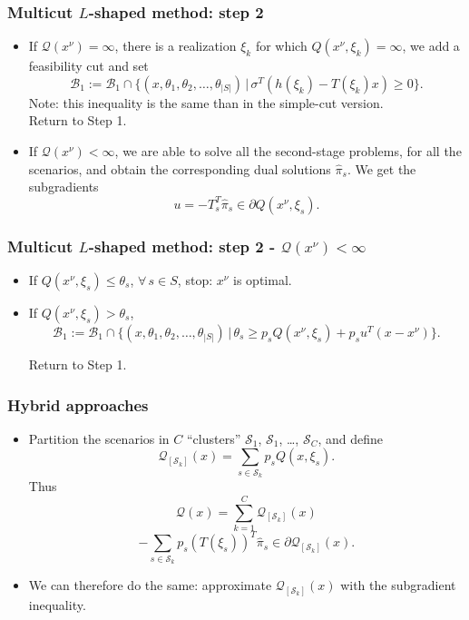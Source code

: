 \documentclass{beamer}
\begin{document}
\begin{frame}
\frametitle{Multicut $L$-shaped method: step 2}
	
\begin{itemize}
\item
If $\mathcal{Q}(x^{\nu}) = \infty$, there is a realization $\xi_k$ for which $Q(x^{\nu}, \xi_k) = \infty$, we add a feasibility cut and set
\[
\mathcal{B}_1 := \mathcal{B}_1 \cap \lbrace
(x,\theta_1,\theta_2,\ldots,\theta_{|S|}) \,|\, \sigma^T(h(\xi_k) -
T(\xi_k)x) \geq 0\rbrace.
\]
Note: this inequality is the same than in the simple-cut version.\\
Return to Step 1.
\item
If $\mathcal{Q}(x^{\nu}) < \infty$, we are able to solve all the second-stage problems, for all the scenarios, and obtain the corresponding dual solutions $\hat{\pi}_s$.
We get the subgradients
\[
u = -T_s^T\hat{\pi}_s \in \partial Q(x^{\nu}, \xi_s).
\]
\end{itemize}
	
\end{frame}

\begin{frame}
\frametitle{Multicut $L$-shaped method: step 2 - $\mathcal{Q}(x^{\nu}) < \infty$}
	
\begin{itemize}
\item
If $Q(x^{\nu}, \xi_s) \leq \theta_s$, $\forall\, s \in S$, stop: $x^{\nu}$ is optimal.
\item
If $Q(x^{\nu}, \xi_s) > \theta_s$,
\[
\mathcal{B}_1 := \mathcal{B}_1 \cap \lbrace (x,\theta_1,\theta_2,\ldots,\theta_{|S|}) \,|\,
\theta_s \geq p_s Q(x^{\nu}, \xi_s) + p_s u^T(x-x^{\nu})\rbrace.
\]
		
Return to Step 1.
\end{itemize}
	
\end{frame}

\begin{frame}
\frametitle{Hybrid approaches}

\begin{itemize}
	\item
	Partition the scenarios in $C$ ``clusters'' $\mathcal{S}_1$,
	$\mathcal{S}_1$, \ldots, $\mathcal{S}_C$, and define
	\[
	\mathcal{Q}_{[\mathcal{S}_k]}(x) = \sum_{s \in \mathcal{S}_k} p_s Q(x, \xi_s).
	\]
	Thus
	\[
	\mathcal{Q}(x) = \sum_{k = 1}^C \mathcal{Q}_{[\mathcal{S}_k]}(x)
	\]
	\[
	-\sum_{s \in \mathcal{S}_k} p_s(T(\xi_s))^T\hat{\pi}_s
	\in \partial \mathcal{Q}_{[\mathcal{S}_k]}(x).
	\]
	\item
	We can therefore do the same: approximate $\mathcal{Q}_{[\mathcal{S}_k]}(x)$ with the subgradient inequality.
\end{itemize}

\end{frame}
\end{document}
